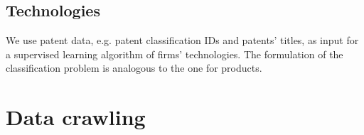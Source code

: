 \documentclass[12pt]{article}
\begin{document}
\subsection{Technologies}
We use patent data, e.g. patent classification IDs and patents' titles, as input for a supervised learning algorithm of firms' technologies.
The formulation of the classification problem is analogous to the one for products.




\newpage


\newpage
\appendix
\section{Data crawling}
\label{app:crawling}
\end{document}
